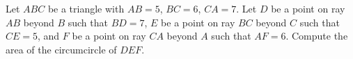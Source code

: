 Let $ABC$ be a triangle with $AB=5$, $BC=6$, $CA=7$. Let $D$ be a point on ray $AB$ beyond $B$ such that $BD=7$, $E$ be a point on ray $BC$ beyond $C$ such that $CE=5$, and $F$ be a point on ray $CA$ beyond $A$ such that $AF=6$. Compute the area of the circumcircle of $DEF$.

